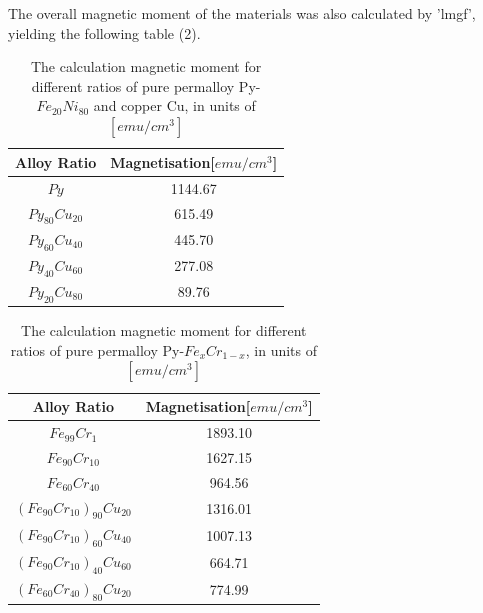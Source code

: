 \documentclass[12pt]{article}
\begin{document}
The overall magnetic moment of the materials was also calculated by 'lmgf', yielding the following table (2).

\begin{table}[h!]
\centering
 \begin{tabular}{||c c||} 
 \hline
 Alloy Ratio & Magnetisation[$emu/cm^3$] \\ [1ex] 
 \hline\hline
 $Py$ & 1144.67 \\ 
 $Py_{80}Cu_{20}$ & 615.49 \\
 $Py_{60}Cu_{40}$ & 445.70 \\
 $Py_{40}Cu_{60}$ & 277.08 \\
 $Py_{20}Cu_{80}$ & 89.76 \\ [1ex] 
 \hline
 \end{tabular}
\caption{The calculation magnetic moment for different ratios of pure permalloy Py-$Fe_{20}Ni_{80}$ and copper Cu, in units of $[emu/cm^3]$} 
\end{table}

\begin{table}[h!]
\centering
 \begin{tabular}{||c c||} 
 \hline
 Alloy Ratio & Magnetisation[$emu/cm^3$] \\ [1ex] 
 \hline\hline
 $Fe_{99}Cr_1$ & 1893.10\\ 
 $Fe_{90}Cr_{10}$ & 1627.15\\
 $Fe_{60}Cr_{40}$ & 964.56 \\
 $(Fe_{90}Cr_{10})_{90}Cu_{20}$ & 1316.01\\ 
 $(Fe_{90}Cr_{10})_{60}Cu_{40}$ & 1007.13\\  
 $(Fe_{90}Cr_{10})_{40}Cu_{60}$ & 664.71\\
 $(Fe_{60}Cr_{40})_{80}Cu_{20}$ & 774.99\\ [1ex]
 \hline
 \end{tabular}
\caption{The calculation magnetic moment for different ratios of pure permalloy Py-$Fe_{x}Cr_{1-x}$, in units of $[emu/cm^3]$} 
\end{table}
\end{document}
